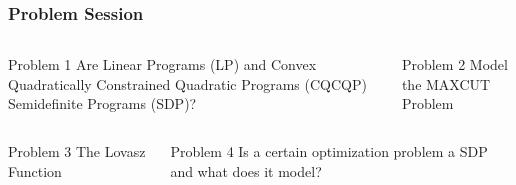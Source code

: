 \documentclass[11pt]{beamer}
\begin{document}
	\begin{frame}
		\frametitle{Problem Session}
		\begin{columns}
			\begin{column}{0.5\textwidth}
				\begin{block}{Problem 1}
					Are Linear Programs (LP) and Convex Quadratically Constrained Quadratic Programs (CQCQP) Semidefinite Programs (SDP)?
				\end{block}
			\end{column}
			\begin{column}{0.5\textwidth}
				\begin{block}{Problem 2}
					\vspace{5.9ex}
					Model the MAXCUT Problem
					\vspace{6ex}
				\end{block}
			\end{column}
		\end{columns}
		\begin{columns}
			\begin{column}{0.5\textwidth}
				\begin{block}{Problem 3}
					\vspace{5.9ex}
					The Lovasz Function
					\vspace{6ex}
				\end{block}
			\end{column}
			\begin{column}{0.5\textwidth}
				\begin{block}{Problem 4}
					\vspace{4.4ex} Is a certain optimization problem a SDP and what does it model?\vspace{4.5ex}
				\end{block}
			\end{column}
		\end{columns}
	\end{frame}
\end{document}
